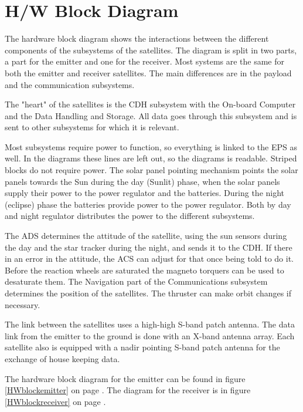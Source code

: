 \section{H/W Block Diagram}
The hardware block diagram shows the interactions between the different components of the subsystems of the satellites. The diagram is split in two parts, a part for the emitter and one for the receiver. Most systems are the same for both the emitter and receiver satellites. The main differences are in the payload and the communication subsystems.

The "heart" of the satellites is the \ac{CDH} subsystem with the On-board Computer and the Data Handling and Storage. All data goes through this subsystem and is sent to other subsystems for which it is relevant. 

Most subsystems require power to function, so everything is linked to the \ac{EPS} as well. In the diagrams these lines are left out, so the diagrams is readable. Striped blocks do not require power. The solar panel pointing mechanism points the solar panels towards the Sun during the day (Sunlit) phase, when the solar panels supply their power to the power regulator and the batteries. During the night (eclipse) phase the batteries provide power to the power regulator. Both by day and night regulator distributes the power to the different subsystems.

The \ac{ADS} determines the attitude of the satellite, using the sun sensors during the day and the star tracker during the night, and sends it to the \ac{CDH}. If there in an error in the attitude, the \ac{ACS} can adjust for that once being told to do it. Before the reaction wheels are saturated the magneto torquers can be used to desaturate them. The Navigation part of the Communications subsystem determines the position of the satellites. The thruster can make orbit changes if necessary.

The link between the satellites uses a high-high S-band patch antenna. The data link from the emitter to the ground is done with an X-band antenna array. Each satellite also is equipped with a nadir pointing S-band patch antenna for the exchange of house keeping data.

The hardware block diagram for the emitter can be found in figure \ref{HWblockemitter} on page \pageref{HWblockemitter}. The diagram for the receiver is in figure \ref{HWblockreceiver} on page \pageref{HWblockreceiver}.

